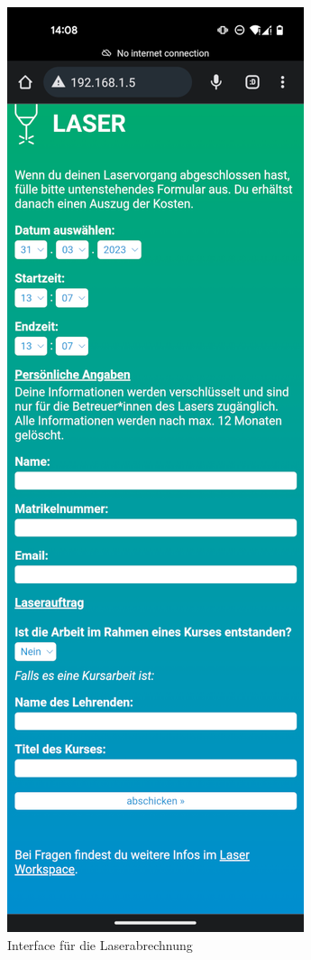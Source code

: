 \documentclass[]{article}
\begin{document}
\begin{figure}
\hypertarget{fig:lasercounter}{%
\centering
\includegraphics{assets/images/payment-screenshot.png}
\caption{Interface für die Laserabrechnung}\label{fig:lasercounter}
}
\end{figure}
\end{document}
